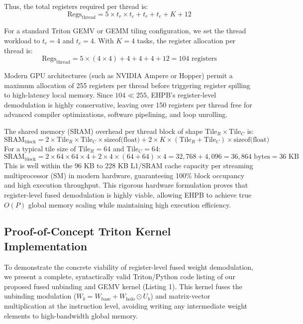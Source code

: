\documentclass{article}
\theoremstyle{plain}
\theoremstyle{definition}
\theoremstyle{remark}
\begin{document}
Thus, the total registers required per thread is:
\begin{equation}
\text{Regs}_{\text{thread}} = 5 \times t_r \times t_c + t_r + t_c + K + 12
\end{equation}

For a standard Triton GEMV or GEMM tiling configuration, we set the thread workload to $t_r = 4$ and $t_c = 4$. With $K = 4$ tasks, the register allocation per thread is:
\begin{equation}
\text{Regs}_{\text{thread}} = 5 \times (4 \times 4) + 4 + 4 + 4 + 12 = 104 \text{ registers}
\end{equation}

Modern GPU architectures (such as NVIDIA Ampere or Hopper) permit a maximum allocation of 255 registers per thread before triggering register spilling to high-latency local memory. Since $104 \ll 255$, EHPB's register-level demodulation is highly conservative, leaving over 150 registers per thread free for advanced compiler optimizations, software pipelining, and loop unrolling. 

The shared memory (SRAM) overhead per thread block of shape $\text{Tile}_R \times \text{Tile}_C$ is:
\begin{equation}
\text{SRAM}_{\text{block}} = 2 \times \text{Tile}_R \times \text{Tile}_C \times \text{sizeof(float)} + 2 \times K \times (\text{Tile}_R + \text{Tile}_C) \times \text{sizeof(float)}
\end{equation}
For a typical tile size of $\text{Tile}_R = 64$ and $\text{Tile}_C = 64$:
\begin{equation}
\text{SRAM}_{\text{block}} = 2 \times 64 \times 64 \times 4 + 2 \times 4 \times (64 + 64) \times 4 = 32,768 + 4,096 = 36,864 \text{ bytes} = 36 \text{ KB}
\end{equation}
This is well within the 96 KB to 228 KB L1/SRAM cache capacity per streaming multiprocessor (SM) in modern hardware, guaranteeing 100\% block occupancy and high execution throughput. This rigorous hardware formulation proves that register-level fused demodulation is highly viable, allowing EHPB to achieve true $O(P)$ global memory scaling while maintaining high execution efficiency.

\subsection{Proof-of-Concept Triton Kernel Implementation}
\label{app:triton_kernel_code}

To demonstrate the concrete viability of register-level fused weight demodulation, we present a complete, syntactically valid Triton/Python code listing of our proposed fused unbinding and GEMV kernel (Listing 1). This kernel fuses the unbinding modulation ($W_b = W_{\text{base}} + W_{\text{holo}} \odot U_b$) and matrix-vector multiplication at the instruction level, avoiding writing any intermediate weight elements to high-bandwidth global memory.
\end{document}
